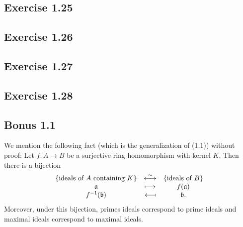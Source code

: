 \documentclass[../A&M.tex]{subfiles}
\begin{document}
\subsection*{Exercise 1.25}

\subsection*{Exercise 1.26}

\subsection*{Exercise 1.27}

\subsection*{Exercise 1.28}

\subsection*{Bonus 1.1}  \label{Bonus 1.1}

We mention the following fact (which is the generalization of (1.1)) without proof: Let $f: A\to B$ be a surjective ring homomorphism with kernel $K$. Then there is a bijection
$$
\begin{array}{ccc}
\{ \text{ideals of } A  \text{ containing } K \} & \overset{\sim}{\longleftrightarrow} & \{ \text{ideals of } B\}   \\
\mathfrak{a} & \longmapsto & f(\mathfrak{a})   \\
f^{-1}(\mathfrak{b}) & \longmapsfrom & \mathfrak{b}.
\end{array}
$$
Moreover, under this bijection, primes ideals correspond to prime ideals and maximal ideals correspond to maximal ideals.
\end{document}
